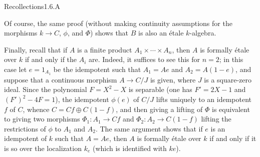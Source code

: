 \begin{enoncerm}{Recollections}{1.6.A}
\begin{enumeratei}
Of course, the same proof (without making continuity assumptions for the morphisms $k\to C$, $\phi$, and $\Phi$) shows that $B$ is also an étale $k$-algebra.
\item Finally, recall that if $A$ is a finite product $A_1\times\cdots\times A_n$, then $A$ is formally étale over $k$ if and only if the $A_i$ are. Indeed, it suffices to see this for $n=2$; in this case let $e=1_{A_1}$ be the idempotent such that $A_1=Ae$ and $A_2=A(1-e)$, and suppose that a continuous morphism $A\to C/J$ is given, where $J$ is a square-zero ideal. Since the polynomial $F=X^2-X$ is separable (one has $F'=2X-1$ and $(F')^2-4F=1$), the idempotent $\phi(e)$ of $C/J$ lifts uniquely to an idempotent $f$ of $C$, whence $C=Cf\oplus C(1-f)$, and then giving a lifting of $\Phi$ is equivalent to giving two morphisms $\Phi_1:A_1\to Cf$ and $\Phi_2:A_2\to C(1-f)$ lifting the restrictions of $\phi$ to $A_1$ and $A_2$.
The same argument shows that if $e$ is an idempotent of $k$ such that $A=Ae$, then $A$ is formally étale over $k$ if and only if it is so over the localization $k_e$ (which is identified with $ke$).
\end{enumeratei}
\end{enoncerm}
